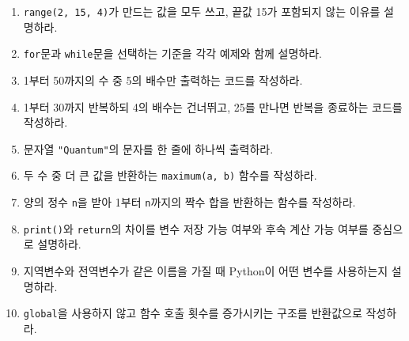 \documentclass[11pt,a4paper]{article}
\begin{document}
\begin{enumerate}
    \item \texttt{range(2, 15, 4)}가 만드는 값을 모두 쓰고, 끝값 15가 포함되지 않는 이유를 설명하라.
    \item \texttt{for}문과 \texttt{while}문을 선택하는 기준을 각각 예제와 함께 설명하라.
    \item 1부터 50까지의 수 중 5의 배수만 출력하는 코드를 작성하라.
    \item 1부터 30까지 반복하되 4의 배수는 건너뛰고, 25를 만나면 반복을 종료하는 코드를 작성하라.
    \item 문자열 \texttt{"Quantum"}의 문자를 한 줄에 하나씩 출력하라.
    \item 두 수 중 더 큰 값을 반환하는 \texttt{maximum(a, b)} 함수를 작성하라.
    \item 양의 정수 \texttt{n}을 받아 1부터 \texttt{n}까지의 짝수 합을 반환하는 함수를 작성하라.
    \item \texttt{print()}와 \texttt{return}의 차이를 변수 저장 가능 여부와 후속 계산 가능 여부를 중심으로 설명하라.
    \item 지역변수와 전역변수가 같은 이름을 가질 때 Python이 어떤 변수를 사용하는지 설명하라.
    \item \texttt{global}을 사용하지 않고 함수 호출 횟수를 증가시키는 구조를 반환값으로 작성하라.
\end{enumerate}
\end{document}
